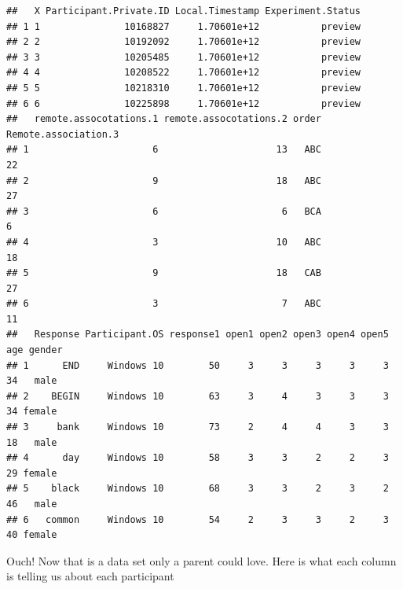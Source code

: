 \documentclass[
]{book}
\begin{document}
\begin{verbatim}
##   X Participant.Private.ID Local.Timestamp Experiment.Status
## 1 1               10168827     1.70601e+12           preview
## 2 2               10192092     1.70601e+12           preview
## 3 3               10205485     1.70601e+12           preview
## 4 4               10208522     1.70601e+12           preview
## 5 5               10218310     1.70601e+12           preview
## 6 6               10225898     1.70601e+12           preview
##   remote.assocotations.1 remote.assocotations.2 order Remote.association.3
## 1                      6                     13   ABC                   22
## 2                      9                     18   ABC                   27
## 3                      6                      6   BCA                    6
## 4                      3                     10   ABC                   18
## 5                      9                     18   CAB                   27
## 6                      3                      7   ABC                   11
##   Response Participant.OS response1 open1 open2 open3 open4 open5 age gender
## 1      END     Windows 10        50     3     3     3     3     3  34   male
## 2    BEGIN     Windows 10        63     3     4     3     3     3  34 female
## 3     bank     Windows 10        73     2     4     4     3     3  18   male
## 4      day     Windows 10        58     3     3     2     2     3  29 female
## 5    black     Windows 10        68     3     3     2     3     2  46   male
## 6   common     Windows 10        54     2     3     3     2     3  40 female
\end{verbatim}

Ouch! Now that is a data set only a parent could love. Here is what each column is telling us about each participant
\end{document}

